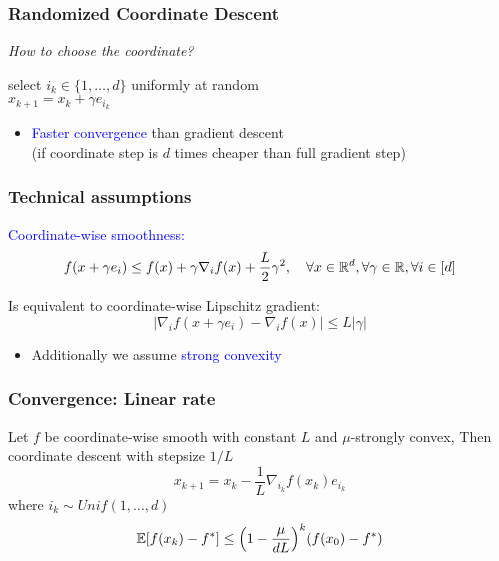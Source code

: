 \documentclass[aspectratio=149]{beamer}
\begin{document}
\begin{frame}
  \frametitle{Randomized Coordinate Descent}

  \textit{How to choose the coordinate?}

  \begin{block}{}
    \begin{center}
      select $i_k \in \{1, \dots, d\}$ uniformly at random\\
      $x_{k+1} = x_k + \gamma e_{i_k}$
    \end{center}
  \end{block}
  \vspace{1cm}
  \begin{itemize}
    \item \textcolor{blue}{Faster convergence} than gradient descent\\
          (if coordinate step is $d$ times cheaper than full gradient step)
  \end{itemize}
\end{frame}

\begin{frame}
  \frametitle{Technical assumptions}

  \begin{block}{}
    \textcolor{blue}{Coordinate-wise smoothness:}
    \begin{equation}
      f(x + \gamma e_i) \le f(x) + \gamma \nabla_i f(x) + \frac{L}{2}\gamma^2, \quad \forall x \in \mathbb{R}^d, \forall \gamma \in \mathbb{R}, \forall i \in [d]
    \end{equation}
  \end{block}
  Is equivalent to coordinate-wise Lipschitz gradient:
  \begin{equation}
    \vert \nabla_i f(x+ \gamma e_i) - \nabla_i f(x) \vert \le L \vert \gamma \vert
  \end{equation}

  \begin{itemize}
    \item Additionally we assume \textcolor{blue}{strong convexity}
  \end{itemize}
\end{frame}

\begin{frame}
  \frametitle{Convergence: Linear rate}
  \begin{theorem}
    \label{thm:}
    Let $f$ be coordinate-wise smooth with constant $L$ and $\mu$-strongly convex, Then \textrm{coordinate descent} with stepsize $1/L$
    \begin{equation}
      x_{k+1} = x_k - \frac{1}{L} \nabla_{i_k} f(x_k) e_{i_k}
    \end{equation}
    where $i_k \sim Unif(1, \dots, d)$
    \begin{equation}
      \mathbb{E} [f(x_k)- f^*] \le {\left(1 - \frac{\mu}{d L}\right)}^k (f(x_0)-f^*)
    \end{equation}
  \end{theorem}
\end{frame}
\end{document}
